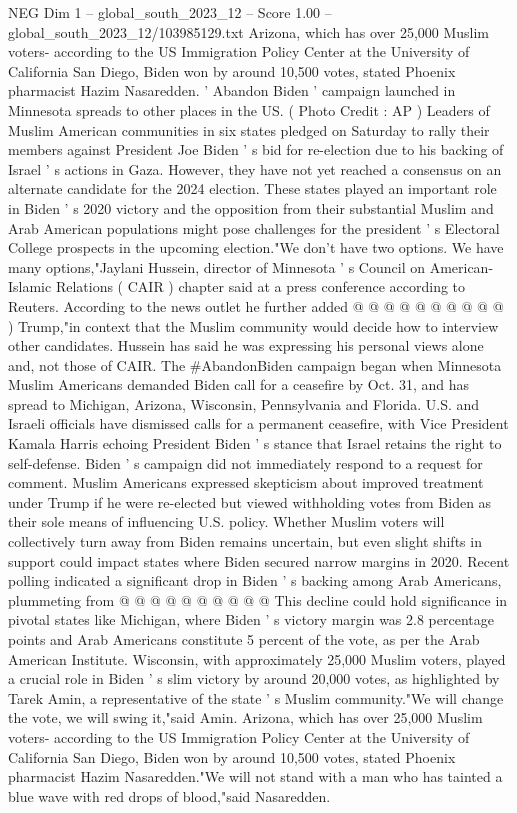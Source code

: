 \begin{textsample}{NEG Dim 1 – global\_south\_2023\_12 – Score 1.00 – global\_south\_2023\_12/103985129.txt}  \label{ex:f1_neg_414}
Arizona, which has over 25,000 Muslim voters- according to the US Immigration Policy Center at the University of California San Diego, Biden won by around 10,500 votes, stated Phoenix pharmacist Hazim Nasaredden. ' Abandon Biden ' campaign launched in Minnesota spreads to other places in the US. ( Photo Credit : AP ) Leaders of Muslim American communities in six states pledged on Saturday to rally their members against President Joe Biden ' s bid for re-election due to his backing of Israel ' s actions in Gaza.
However, they have not yet reached a consensus on an alternate candidate for the 2024 election.
These states played an important role in Biden ' s 2020 victory and the opposition from their substantial Muslim and Arab American populations might pose challenges for the president ' s Electoral College prospects in the upcoming election."We don't have two options.
We have many options,"Jaylani Hussein, director of Minnesota ' s Council on American-Islamic Relations ( CAIR ) chapter said at a press conference according to Reuters.
According to the news outlet he further added @ @ @ @ @ @ @ @ @ @ ) Trump,"in context that the Muslim community would decide how to interview other candidates.
Hussein has said he was expressing his personal views alone and, not those of CAIR.
The \#AbandonBiden campaign began when Minnesota Muslim Americans demanded Biden call for a ceasefire by Oct. 31, and has spread to Michigan, Arizona, Wisconsin, Pennsylvania and Florida.
U.S. and Israeli officials have dismissed calls for a permanent ceasefire, with Vice President Kamala Harris echoing President Biden ' s stance that Israel retains the right to self-defense.
Biden ' s campaign did not immediately respond to a request for comment.
Muslim Americans expressed skepticism about improved treatment under Trump if he were re-elected but viewed withholding votes from Biden as their sole means of influencing U.S. policy.
Whether Muslim voters will collectively turn away from Biden remains uncertain, but even slight shifts in support could impact states where Biden secured narrow margins in 2020.
Recent polling indicated a significant drop in Biden ' s backing among Arab Americans, plummeting from @ @ @ @ @ @ @ @ @ @ This decline could hold significance in pivotal states like Michigan, where Biden ' s victory margin was 2.8 percentage points and Arab Americans constitute 5 percent of the vote, as per the Arab American Institute.
Wisconsin, with approximately 25,000 Muslim voters, played a crucial role in Biden ' s slim victory by around 20,000 votes, as highlighted by Tarek Amin, a representative of the state ' s Muslim community."We will change the vote, we will swing it,"said Amin.
Arizona, which has over 25,000 Muslim voters- according to the US Immigration Policy Center at the University of California San Diego, Biden won by around 10,500 votes, stated Phoenix pharmacist Hazim Nasaredden."We will not stand with a man who has tainted a blue wave with red drops of blood,"said Nasaredden.

\end{textsample}
